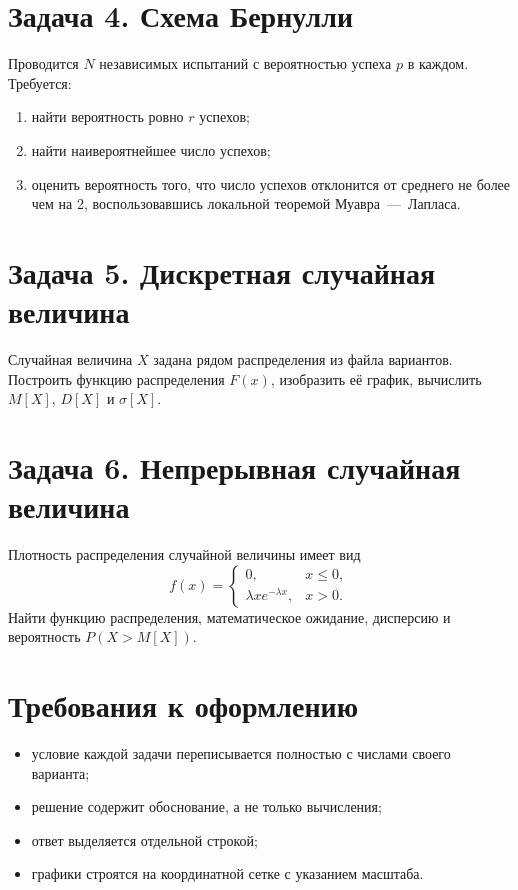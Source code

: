 \documentclass[12pt, a4paper]{article}
\begin{document}
\section*{Задача 4. Схема Бернулли}

Проводится $N$ независимых испытаний с вероятностью успеха $p$ в каждом.
Требуется:
\begin{enumerate}[label={\asbuk{enumi})}]
  \item найти вероятность ровно $r$ успехов;
  \item найти наивероятнейшее число успехов;
  \item оценить вероятность того, что число успехов отклонится от среднего
        не более чем на 2, воспользовавшись локальной теоремой Муавра~---~Лапласа.
\end{enumerate}

\section*{Задача 5. Дискретная случайная величина}

Случайная величина $X$ задана рядом распределения из файла вариантов.
Построить функцию распределения $F(x)$, изобразить её график,
вычислить $M[X]$, $D[X]$ и $\sigma[X]$.

\section*{Задача 6. Непрерывная случайная величина}

Плотность распределения случайной величины имеет вид
\[
  f(x) =
  \begin{cases}
    0, & x \le 0,\\
    \lambda x e^{-\lambda x}, & x > 0.
  \end{cases}
\]
Найти функцию распределения, математическое ожидание, дисперсию
и вероятность $P(X > M[X])$.

\vspace{1.5em}

\section*{Требования к оформлению}

\begin{itemize}[nosep]
  \item условие каждой задачи переписывается полностью с числами своего варианта;
  \item решение содержит обоснование, а не только вычисления;
  \item ответ выделяется отдельной строкой;
  \item графики строятся на координатной сетке с указанием масштаба.
\end{itemize}
\end{document}
